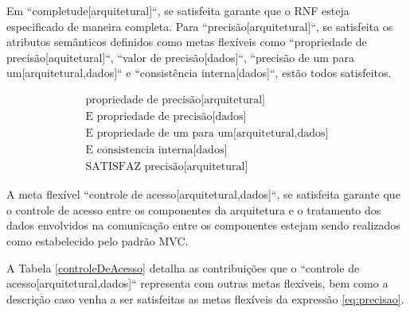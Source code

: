 Em ``completude[arquitetural]``, se satisfeita garante que o RNF esteja especificado de maneira completa. Para ``precisão[arquitetural]``, se satisfeita os atributos semânticos definidos como metas flexíveis como ``propriedade de precisão[aquitetural]``, ``valor de precisão[dados]``, ``precisão de um para um[arquitetural,dados]`` e ``consistência interna[dados]``, estão todos satisfeitos.

\newpage

\begin{eqnarray}
\label{eq:precisao}
\textrm{propriedade de precisão[arquitetural]} \nonumber\\
\textrm{E propriedade de precisão[dados]} \nonumber\\
\textrm{E propriedade de um para um[arquitetural,dados]} \nonumber\\
\textrm{E consistencia interna[dados]} \nonumber\\
\textrm{SATISFAZ precisão[arquitetural]}
\end{eqnarray}

A meta flexível ``controle de acesso[arquitetural,dados]``, se satisfeita garante que o controle de acesso entre os componentes da arquitetura e o tratamento dos dados envolvidos na comunicação entre os componentes estejam sendo realizados como estabelecido pelo padrão MVC.

A Tabela \ref{controleDeAcesso} detalha as contribuições que o ``controle de acesso[arquitetural,dados]`` representa com outras metas flexíveis, bem como a descrição caso venha a ser satisfeitas as metas flexíveis da expressão \ref{eq:precisao}.

